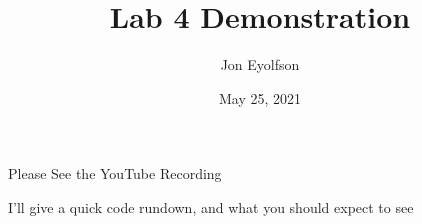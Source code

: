 

\title{Lab 4 Demonstration}
\author{Jon Eyolfson}
\date{May 25, 2021}


  \begin{frame}
    \titlepage
  \end{frame}

  \begin{frame}{Please See the YouTube Recording}

    I'll give a quick code rundown, and what you should expect to see
  \end{frame}

